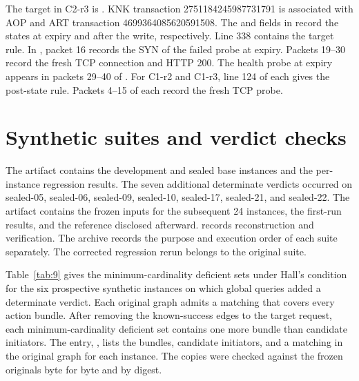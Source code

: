 The target in C2-r3 is . KNK transaction 2751184245987731791 is associated with AOP and ART transaction 4699364085620591508. The  and  fields in  record the states at expiry and after the write, respectively. Line 338 contains the target rule. In , packet 16 records the SYN of the failed probe at expiry. Packets 19--30 record the fresh TCP connection and HTTP 200. The health probe at expiry appears in packets 29--40 of . For C1-r2 and C1-r3, line 124 of each  gives the post-state rule. Packets 4--15 of each  record the fresh TCP probe.

\section{Synthetic suites and verdict checks}\label{synthetic-suites-and-verdict-checks}

The  artifact contains the development and sealed base instances and the per-instance regression results. The seven additional determinate verdicts occurred on sealed-05, sealed-06, sealed-09, sealed-10, sealed-17, sealed-21, and sealed-22. The  artifact contains the frozen inputs for the subsequent 24 instances, the first-run results, and the reference disclosed afterward.  records reconstruction and verification. The archive records the purpose and execution order of each suite separately. The corrected regression rerun belongs to the original suite.

Table~\ref{tab:9} gives the minimum-cardinality deficient sets under Hall's condition for the six prospective synthetic instances on which global queries added a determinate verdict. Each original graph admits a matching that covers every action bundle. After removing the known-success edges to the target request, each minimum-cardinality deficient set contains one more bundle than candidate initiators. The  entry, , lists the bundles, candidate initiators, and a matching in the original graph for each instance. The copies were checked against the frozen originals byte for byte and by digest.

